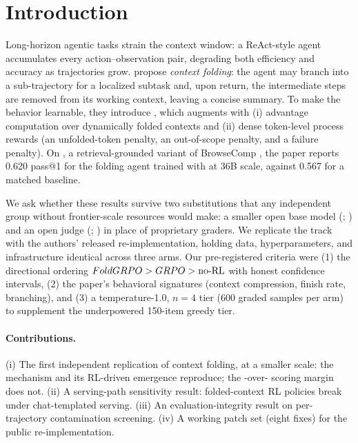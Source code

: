 \section{Introduction}
\label{sec:intro}

Long-horizon agentic tasks strain the context window: a ReAct-style agent
\citep{yao2023react} accumulates every action--observation pair, degrading both efficiency and
accuracy as trajectories grow. \citet{sun2025contextfolding} propose \emph{context folding}: the
agent may branch into a sub-trajectory for a localized subtask and, upon return, the
intermediate steps are removed from its working context, leaving a concise summary. To make the
behavior learnable, they introduce \foldgrpo{}, which augments \grpo{}
\citep{shao2024deepseekmath} with (i) advantage computation over dynamically folded contexts and
(ii) dense token-level process rewards (an unfolded-token penalty, an out-of-scope penalty, and
a failure penalty). On \bcplus{} \citep{chen2025browsecompplus}, a retrieval-grounded variant of
BrowseComp \citep{wei2025browsecomp}, the paper reports 0.620 pass@1 for the folding agent
trained with \foldgrpo{} at 36B scale, against 0.567 for a matched \grpo{} baseline.

We ask whether these results survive two substitutions that any independent group without
frontier-scale resources would make: a smaller open base model (\qwen{};
\citealp{yang2025qwen3}) and an open judge (\judgemodel{}; \citealp{openai2025gptoss}) in place
of proprietary graders. We replicate the \bcplus{} track with the authors' released
re-implementation, holding data, hyperparameters, and infrastructure identical across three
arms. Our pre-registered criteria were (1) the directional ordering
$FoldGRPO{} > GRPO{} > \text{no-RL}$ with honest confidence intervals, (2) the paper's
behavioral signatures (context compression, finish rate, branching), and (3) a
temperature-1.0, $n{=}4$ tier (600 graded samples per arm) to supplement the underpowered
150-item greedy tier.

\paragraph{Contributions.} (i) The first independent replication of context folding, at a
smaller scale: the mechanism and its RL-driven emergence reproduce; the \foldgrpo{}-over-\grpo{}
scoring margin does not. (ii) A serving-path sensitivity result: folded-context RL policies
break under chat-templated serving. (iii) An evaluation-integrity result on per-trajectory
contamination screening. (iv) A working patch set (eight fixes) for the public
re-implementation.

